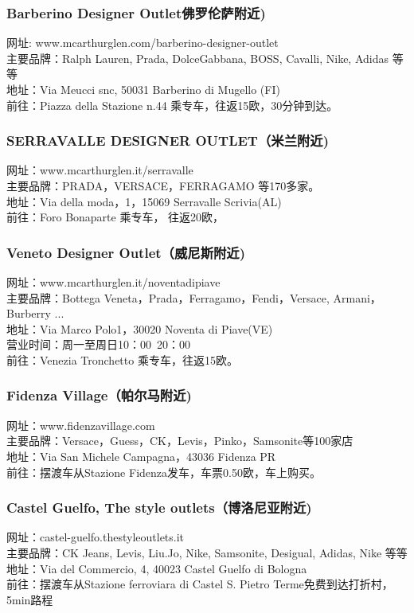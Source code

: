 \begin{multicols}{2}
\subsubsection{Barberino Designer Outlet佛罗伦萨附近)}
\noindent 网址: www.mcarthurglen.com/barberino-designer-outlet\\
主要品牌：Ralph Lauren, Prada, DolceGabbana, BOSS, Cavalli, Nike, Adidas 等等\\
地址：Via Meucci snc, 50031 Barberino di Mugello (FI)\\
前往：Piazza della Stazione n.44 乘专车，往返15欧，30分钟到达。
 
\subsubsection{SERRAVALLE DESIGNER OUTLET（米兰附近)}
\noindent 网址：www.mcarthurglen.it/serravalle\\
主要品牌：PRADA，VERSACE，FERRAGAMO 等170多家。\\
地址：Via della moda，1，15069 Serravalle Scrivia(AL)\\
前往：Foro Bonaparte 乘专车， 往返20欧，
 
\subsubsection{Veneto Designer Outlet（威尼斯附近)}
\noindent 网址：www.mcarthurglen.it/noventadipiave \\
主要品牌：Bottega Veneta，Prada，Ferragamo，Fendi，Versace, Armani，Burberry ... \\
地址：Via Marco Polo1，30020 Noventa di Piave(VE) \\
营业时间：周一至周日10：00~20：00\\
前往：Venezia Tronchetto 乘专车，往返15欧。
 
\subsubsection{Fidenza Village（帕尔马附近)}
\noindent 网址：www.fidenzavillage.com\\
主要品牌：Versace，Guess，CK，Levis，Pinko，Samsonite等100家店\\
地址：Via San Michele Campagna，43036 Fidenza PR\\
前往：摆渡车从Stazione Fidenza发车，车票0.50欧，车上购买。

\subsubsection{Castel Guelfo, The style outlets（博洛尼亚附近)}
\noindent 网址：castel-guelfo.thestyleoutlets.it\\
主要品牌：CK Jeans, Levis, Liu.Jo, Nike, Samsonite, Desigual, Adidas, Nike 等等\\
地址：Via del Commercio, 4, 40023 Castel Guelfo di Bologna\\
前往：摆渡车从Stazione ferroviara di Castel S. Pietro Terme免费到达打折村，5min路程

\end{multicols}